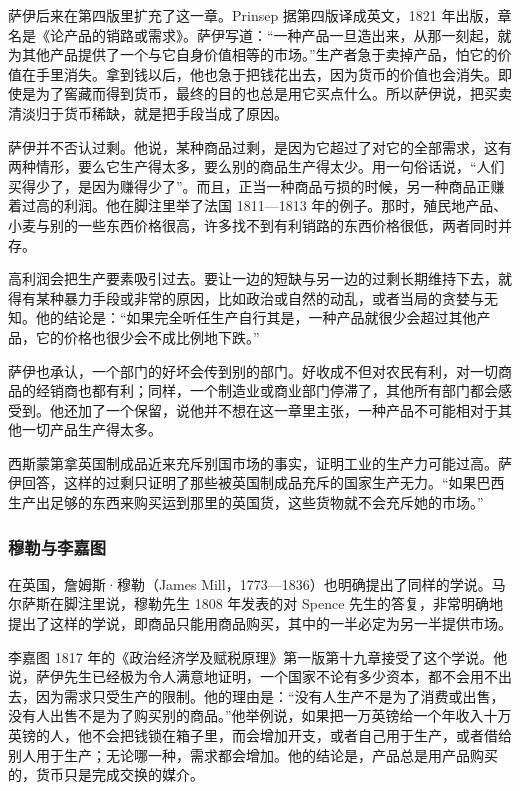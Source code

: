 萨伊后来在第四版里扩充了这一章。Prinsep 据第四版译成英文，1821 年出版，章名是《论产品的销路或需求》\cite{say1821}。萨伊写道：“一种产品一旦造出来，从那一刻起，就为其他产品提供了一个与它自身价值相等的市场。”\cite{say1821}生产者急于卖掉产品，怕它的价值在手里消失。拿到钱以后，他也急于把钱花出去，因为货币的价值也会消失\cite{say1821}。即使是为了窖藏而得到货币，最终的目的也总是用它买点什么\cite{say1821}。所以萨伊说，把买卖清淡归于货币稀缺，就是把手段当成了原因\cite{say1821}。

萨伊并不否认过剩。他说，某种商品过剩，是因为它超过了对它的全部需求，这有两种情形，要么它生产得太多，要么别的商品生产得太少。用一句俗话说，“人们买得少了，是因为赚得少了”\cite{say1821}。而且，正当一种商品亏损的时候，另一种商品正赚着过高的利润\cite{say1821}。他在脚注里举了法国 1811—1813 年的例子。那时，殖民地产品、小麦与别的一些东西价格很高，许多找不到有利销路的东西价格很低，两者同时并存\cite{say1821}。

高利润会把生产要素吸引过去。要让一边的短缺与另一边的过剩长期维持下去，就得有某种暴力手段或非常的原因，比如政治或自然的动乱，或者当局的贪婪与无知\cite{say1821}。他的结论是：“如果完全听任生产自行其是，一种产品就很少会超过其他产品，它的价格也很少会不成比例地下跌。”\cite{say1821}

萨伊也承认，一个部门的好坏会传到别的部门。好收成不但对农民有利，对一切商品的经销商也都有利；同样，一个制造业或商业部门停滞了，其他所有部门都会感受到\cite{say1821}。他还加了一个保留，说他并不想在这一章里主张，一种产品不可能相对于其他一切产品生产得太多\cite{say1821}。

西斯蒙第拿英国制成品近来充斥别国市场的事实，证明工业的生产力可能过高。萨伊回答，这样的过剩只证明了那些被英国制成品充斥的国家生产无力\cite{say1821}。“如果巴西生产出足够的东西来购买运到那里的英国货，这些货物就不会充斥她的市场。”\cite{say1821}

\subsubsection{穆勒与李嘉图}
在英国，詹姆斯·穆勒（James Mill，1773—1836）也明确提出了同样的学说。马尔萨斯在脚注里说，穆勒先生 1808 年发表的对 Spence 先生的答复，非常明确地提出了这样的学说，即商品只能用商品购买，其中的一半必定为另一半提供市场\cite{malthus1820}。

李嘉图 1817 年的《政治经济学及赋税原理》第一版第十九章接受了这个学说。他说，萨伊先生已经极为令人满意地证明，一个国家不论有多少资本，都不会用不出去，因为需求只受生产的限制\cite{ricardo1817}。他的理由是：“没有人生产不是为了消费或出售，没有人出售不是为了购买别的商品。”\cite{ricardo1817}他举例说，如果把一万英镑给一个年收入十万英镑的人，他不会把钱锁在箱子里，而会增加开支，或者自己用于生产，或者借给别人用于生产；无论哪一种，需求都会增加\cite{ricardo1817}。他的结论是，产品总是用产品购买的，货币只是完成交换的媒介\cite{ricardo1817}。

